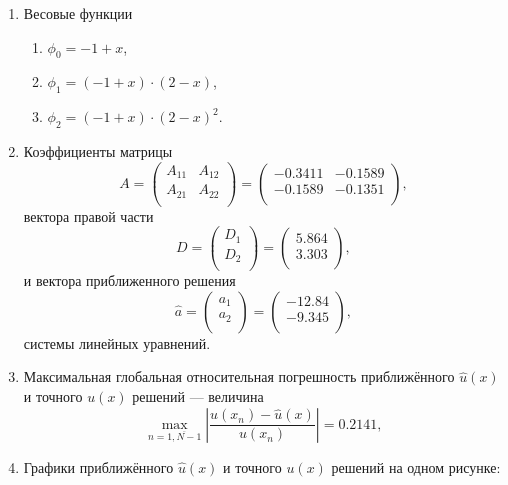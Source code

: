 \documentclass[oneside, final, 12pt]{article}
\begin{document}
\begin{enumerate}
    \item Весовые функции
    \begin{enumerate}
        \item $\phi_0 = -1 + x$,
        \item $\phi_1 = (-1 + x) \cdot (2 - x)$,
        \item $\phi_2 = (-1 + x) \cdot (2 - x) ^ 2$.
    \end{enumerate}
    \item Коэффициенты матрицы \begin{equation*}
    A = \begin{pmatrix}
  A_{11} & A_{12} \\
  A_{21} & A_{22} \\
 \end{pmatrix} = \begin{pmatrix}
 -0.3411 & -0.1589\\
 -0.1589 & -0.1351\\
 \end{pmatrix},\end{equation*}
 вектора правой части \begin{equation*}D = \begin{pmatrix}
  D_{1} \\
  D_{2} \\
 \end{pmatrix} = \begin{pmatrix}
  5.864\\
  3.303\\
 \end{pmatrix},\end{equation*} и вектора приближенного решения \begin{equation*}\hat{a} = \begin{pmatrix}
  a_{1} \\
  a_{2} \\
 \end{pmatrix} = \begin{pmatrix}
  -12.84\\
  -9.345\\
 \end{pmatrix},\end{equation*} системы линейных уравнений.
    \item Максимальная глобальная относительная погрешность приближённого $\hat{u} (x)$ и точного $u(x)$  решений — величина
    \begin{equation*}
        \max\limits_{n = \overline{1, N-1}} \left| \dfrac{u(x_n) - \hat{u}(x)}{u(x_n)} \right| = 0.2141,
    \end{equation*}
    \item Графики приближённого $\hat{u}(x)$ и точного $u(x)$ решений на одном рисунке:


\end{enumerate}
\end{document}
